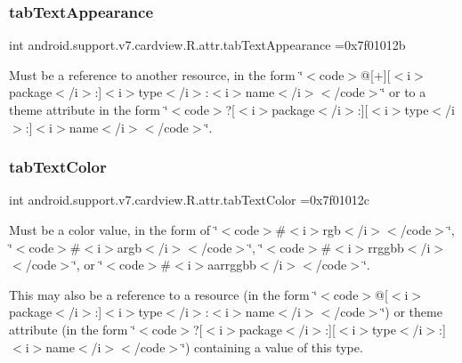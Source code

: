 \subsubsection{\texorpdfstring{tab\+Text\+Appearance}{tabTextAppearance}}
{\footnotesize\ttfamily int android.\+support.\+v7.\+cardview.\+R.\+attr.\+tab\+Text\+Appearance =0x7f01012b\hspace{0.3cm}{\ttfamily [static]}}

Must be a reference to another resource, in the form \char`\"{}$<$code$>$@\mbox{[}+\mbox{]}\mbox{[}$<$i$>$package$<$/i$>$\+:\mbox{]}$<$i$>$type$<$/i$>$\+:$<$i$>$name$<$/i$>$$<$/code$>$\char`\"{} or to a theme attribute in the form \char`\"{}$<$code$>$?\mbox{[}$<$i$>$package$<$/i$>$\+:\mbox{]}\mbox{[}$<$i$>$type$<$/i$>$\+:\mbox{]}$<$i$>$name$<$/i$>$$<$/code$>$\char`\"{}. \mbox{\label{classandroid_1_1support_1_1v7_1_1cardview_1_1R_1_1attr_aef38b3fa4a5c5d4184041e5dec1e70a7}} 
\subsubsection{\texorpdfstring{tab\+Text\+Color}{tabTextColor}}
{\footnotesize\ttfamily int android.\+support.\+v7.\+cardview.\+R.\+attr.\+tab\+Text\+Color =0x7f01012c\hspace{0.3cm}{\ttfamily [static]}}

Must be a color value, in the form of \char`\"{}$<$code$>$\#$<$i$>$rgb$<$/i$>$$<$/code$>$\char`\"{}, \char`\"{}$<$code$>$\#$<$i$>$argb$<$/i$>$$<$/code$>$\char`\"{}, \char`\"{}$<$code$>$\#$<$i$>$rrggbb$<$/i$>$$<$/code$>$\char`\"{}, or \char`\"{}$<$code$>$\#$<$i$>$aarrggbb$<$/i$>$$<$/code$>$\char`\"{}. 

This may also be a reference to a resource (in the form \char`\"{}$<$code$>$@\mbox{[}$<$i$>$package$<$/i$>$\+:\mbox{]}$<$i$>$type$<$/i$>$\+:$<$i$>$name$<$/i$>$$<$/code$>$\char`\"{}) or theme attribute (in the form \char`\"{}$<$code$>$?\mbox{[}$<$i$>$package$<$/i$>$\+:\mbox{]}\mbox{[}$<$i$>$type$<$/i$>$\+:\mbox{]}$<$i$>$name$<$/i$>$$<$/code$>$\char`\"{}) containing a value of this type. \mbox{\label{classandroid_1_1support_1_1v7_1_1cardview_1_1R_1_1attr_a319eca13d313e050d22fac372aa21425}} 
